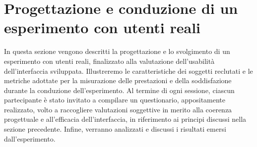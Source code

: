 \section{Progettazione e conduzione di un esperimento con utenti reali}

In questa sezione vengono descritti la progettazione e lo svolgimento di un esperimento con utenti reali, finalizzato alla valutazione dell’usabilità dell’interfaccia sviluppata. Illustreremo le caratteristiche dei soggetti reclutati e le metriche adottate per la misurazione delle prestazioni e della soddisfazione durante la conduzione dell'esperimento.
Al termine di ogni sessione, ciascun partecipante è stato invitato a compilare un questionario, appositamente realizzato, volto a raccogliere valutazioni soggettive in merito alla coerenza progettuale e all’efficacia dell’interfaccia, in riferimento ai principi discussi nella sezione precedente. Infine, verranno analizzati e discussi i risultati emersi dall’esperimento.




